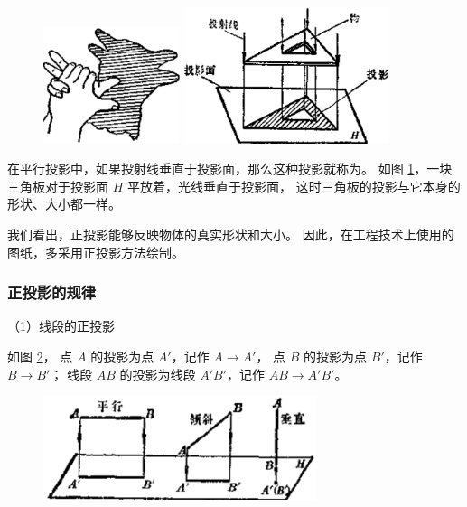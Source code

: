 \begin{figure}[htbp]
    \centering
    \begin{minipage}[b]{7cm}
        \centering
        \includegraphics[width=4cm]{../pic/czjh2-ch8-02.png}
        \caption{}\label{fig:czjh2-8-2}
    \end{minipage}
    \begin{minipage}[b]{7cm}
        \centering
        \includegraphics[width=6cm]{../pic/czjh2-ch8-03.png}
        \caption{}\label{fig:czjh2-8-3}
    \end{minipage}
\end{figure}

在平行投影中，如果投射线垂直于投影面，那么这种投影就称为。
如图 \ref{fig:czjh2-8-3}，一块三角板对于投影面 $H$ 平放着，光线垂直于投影面，
这时三角板的投影与它本身的形状、大小都一样。

我们看出，正投影能够反映物体的真实形状和大小。
因此，在工程技术上使用的图纸，多采用正投影方法绘制。


\subsubsection{正投影的规律}

（1）线段的正投影

如图 \ref{fig:czjh2-8-4}，
点 $A$ 的投影为点 $A'$，记作 $A \to A'$，
点 $B$ 的投影为点 $B'$，记作 $B \to B'$；
线段 $AB$ 的投影为线段 $A'B'$，记作 $AB \to A'B'$。

\begin{figure}[htbp]
    \centering
    \includegraphics[width=8cm]{../pic/czjh2-ch8-04.png}
    \caption{}\label{fig:czjh2-8-4}
\end{figure}

